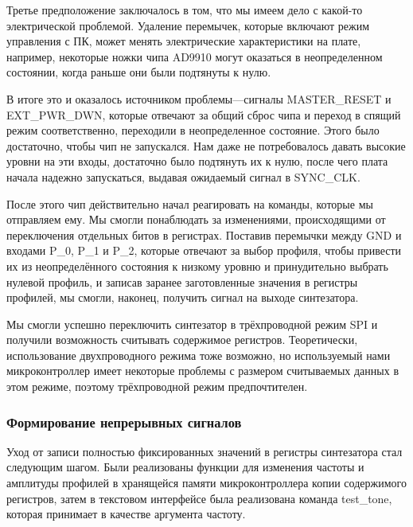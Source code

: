 \documentclass[rusmathsym, eqnumwithinsec, amspack, hyperref]{bomgost}
\begin{document}
Третье предположение заключалось в том, что мы имеем дело с какой-то электрической проблемой. Удаление перемычек, которые включают режим управления с ПК, может менять электрические характеристики на плате, например, некоторые ножки чипа AD9910 могут оказаться в неопределенном состоянии, когда раньше они были подтянуты к нулю.

В итоге это и оказалось источником проблемы—сигналы MASTER\_RESET и EXT\_PWR\_DWN, которые отвечают за общий сброс чипа и переход в спящий режим соответственно, переходили в неопределенное состояние. Этого было достаточно, чтобы чип не запускался. Нам даже не потребовалось давать высокие уровни на эти входы, достаточно было подтянуть их к нулю, после чего плата начала надежно запускаться, выдавая ожидаемый сигнал в SYNC\_CLK.

После этого чип действительно начал реагировать на команды, которые мы отправляем ему. Мы смогли понаблюдать за изменениями, происходящими от переключения отдельных битов в регистрах. Поставив перемычки между GND и входами P\_0, P\_1 и P\_2, которые отвечают за выбор профиля, чтобы привести их из неопределённого состояния к низкому уровню и принудительно выбрать нулевой профиль, и записав заранее заготовленные значения в регистры профилей, мы смогли, наконец, получить сигнал на выходе синтезатора.

Мы смогли успешно переключить синтезатор в трёхпроводной режим SPI и получили возможность считывать содержимое регистров. Теоретически, использование двухпроводного режима тоже возможно, но используемый нами микроконтроллер имеет некоторые проблемы с размером считываемых данных в этом режиме, поэтому трёхпроводной режим предпочтителен.

\subsubsection{Формирование непрерывных сигналов}

Уход от записи полностью фиксированных значений в регистры синтезатора стал следующим шагом. Были реализованы функции для изменения частоты и амплитуды профилей в хранящейся памяти микроконтроллера копии содержимого регистров, затем в текстовом интерфейсе была реализована команда test\_tone, которая принимает в качестве аргумента частоту.
\end{document}
